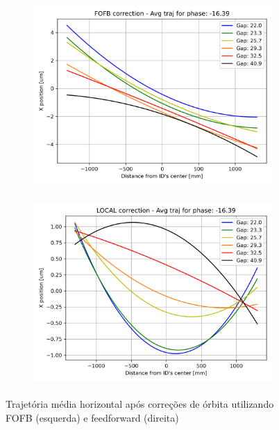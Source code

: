 \documentclass[a4paper,12pt]{article}
\begin{document}
\begin{figure}[H]
\begin{subfigure}{0.5\textwidth}
\includegraphics[width=0.9\linewidth, height=7cm]{figs/phase-16 horizontal-avg-traj-FOFB.png} 
\label{fig:subim10xc-16}
\end{subfigure}
\begin{subfigure}{0.5\textwidth}
\includegraphics[width=0.9\linewidth, height=7cm]{figs/phase-16 horizontal-avg-traj-LOCAL.png}
\label{fig:subim20xc-16}
\end{subfigure}
\caption{Trajetória média horizontal após correções de órbita utilizando FOFB (esquerda) e feedforward (direita)}
\label{fig:-16corrx}
\end{figure}
\end{document}
